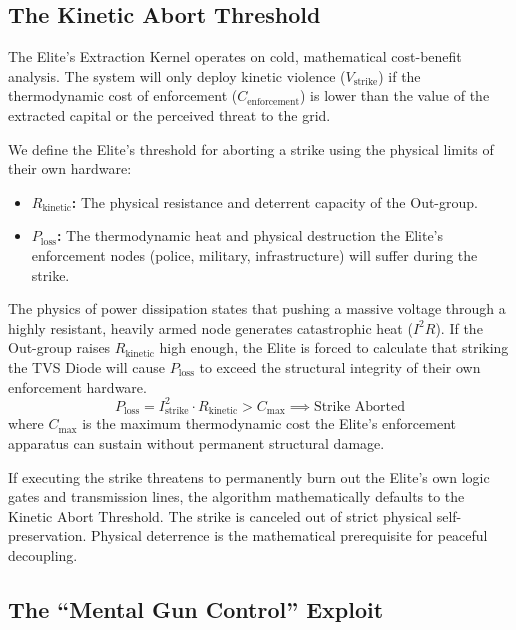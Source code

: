 \subsection{The Kinetic Abort Threshold}

The Elite's Extraction Kernel operates on cold, mathematical cost-benefit analysis. The system will only deploy kinetic violence ($V_{\text{strike}}$) if the thermodynamic cost of enforcement ($C_{\text{enforcement}}$) is lower than the value of the extracted capital or the perceived threat to the grid.

\begin{definition}
We define the Elite's threshold for aborting a strike using the physical limits of their own hardware:
\begin{itemize}
\item \textbf{$R_{\text{kinetic}}$:} The physical resistance and deterrent capacity of the Out-group.
\item \textbf{$P_{\text{loss}}$:} The thermodynamic heat and physical destruction the Elite's enforcement nodes (police, military, infrastructure) will suffer during the strike.
\end{itemize}

The physics of power dissipation states that pushing a massive voltage through a highly resistant, heavily armed node generates catastrophic heat ($I^2R$). If the Out-group raises $R_{\text{kinetic}}$ high enough, the Elite is forced to calculate that striking the TVS Diode will cause $P_{\text{loss}}$ to exceed the structural integrity of their own enforcement hardware.
\begin{equation}\label{eq:13.tvs-abort}
P_{\text{loss}} = I_{\text{strike}}^2 \cdot R_{\text{kinetic}} > C_{\text{max}}
\implies \text{Strike Aborted}
\end{equation}
where $C_{\text{max}}$ is the maximum thermodynamic cost the Elite's enforcement apparatus can sustain without permanent structural damage.
\end{definition}

If executing the strike threatens to permanently burn out the Elite's own logic gates and transmission lines, the algorithm mathematically defaults to the Kinetic Abort Threshold. The strike is canceled out of strict physical self-preservation. Physical deterrence is the mathematical prerequisite for peaceful decoupling.

\subsection{The ``Mental Gun Control'' Exploit}

